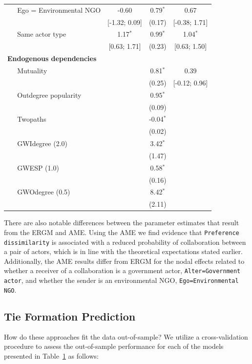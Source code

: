 \documentclass[9pt,twocolumn,twoside,lineno]{pnas-new}
\begin{document}
\begin{table}[ht]
\begin{tabular}{lccc}
  $\;\;\;\;$ Ego = Environmental NGO & -0.60 & 0.79$^{\ast}$ & 0.67 \\
  & [-1.32; 0.09] & (0.17) & [-0.38; 1.71] \\
  $\;\;\;\;$ Same actor type & 1.17$^{\ast}$ & 0.99$^{\ast}$ & 1.04$^{\ast}$ \\
   & [0.63; 1.71] & (0.23) & [0.63; 1.50] \\
  \textbf{Endogenous dependencies}  &  &  &  \\
  $\;\;\;\;$ Mutuality &  & 0.81$^{\ast}$ & 0.39 \\
   &  & (0.25) & [-0.12; 0.96] \\
  $\;\;\;\;$ Outdegree popularity  &  & 0.95$^{\ast}$ &  \\
   &  & (0.09) &  \\
  $\;\;\;\;$ Twopaths  &  & -0.04$^{\ast}$ &  \\
  &  & (0.02) &  \\
  $\;\;\;\;$ GWIdegree (2.0)  &  & 3.42$^{\ast}$ &  \\
   &  & (1.47) &  \\
  $\;\;\;\;$ GWESP (1.0)  &  & 0.58$^{\ast}$ &  \\
   &  & (0.16) &  \\
  $\;\;\;\;$ GWOdegree (0.5)  &  & 8.42$^{\ast}$ &  \\
   &  & (2.11) &  \\
   \hline
\hline
\end{tabular}
\label{tab:regTable}
\end{table}
\FloatBarrier

There are also notable differences between the parameter estimates that result from the ERGM and AME. Using the AME we find evidence that \texttt{Preference dissimilarity} is associated with a reduced probability of collaboration between a pair of actors, which is in line with the theoretical expectations stated earlier. Additionally, the AME results differ from ERGM for the nodal effects related to whether a receiver of a collaboration is a government actor, \texttt{Alter=Government actor}, and whether the sender is an environmental NGO, \texttt{Ego=Environmental NGO}.

\subsection*{Tie Formation Prediction}

How do these approaches fit the data out-of-sample? We utilize a cross-validation procedure to assess the out-of-sample performance for each of the models presented in Table~\ref{tab:regTable} as follows:
\end{document}
